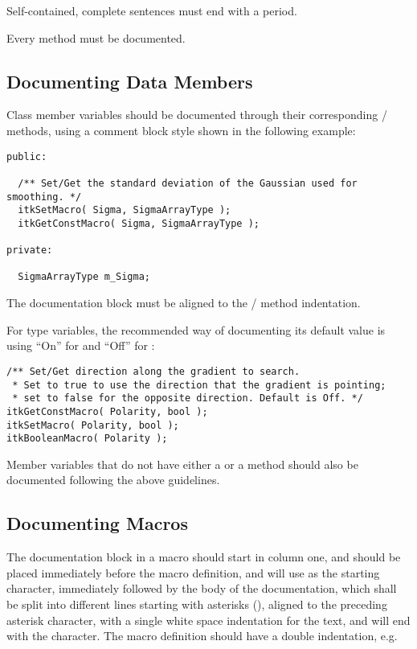 Self-contained, complete sentences must end with a period.

Every method must be documented.


\subsection{Documenting Data Members}
\label{subsec:DocumentingDataMembers}

Class member variables should be documented through their corresponding
/ methods, using a comment block style shown in
the following example:

\small
\begin{verbatim}
public:

  /** Set/Get the standard deviation of the Gaussian used for smoothing. */
  itkSetMacro( Sigma, SigmaArrayType );
  itkGetConstMacro( Sigma, SigmaArrayType );

private:

  SigmaArrayType m_Sigma;

\end{verbatim}
\normalsize

The documentation block must be aligned to the /
method indentation.

For  type variables, the recommended way of documenting its default
value is using ``On'' for  and ``Off'' for :

\small
\begin{verbatim}
/** Set/Get direction along the gradient to search.
 * Set to true to use the direction that the gradient is pointing;
 * set to false for the opposite direction. Default is Off. */
itkGetConstMacro( Polarity, bool );
itkSetMacro( Polarity, bool );
itkBooleanMacro( Polarity );
\end{verbatim}
\normalsize

Member variables that do not have either a  or a
 method should also be documented following the above
guidelines.


\subsection{Documenting Macros}
\label{subsec:DocumentingMacros}

The documentation block in a macro should start in column one, and should be
placed immediately before the macro definition, and will use \code{/*} as the
starting character, immediately followed by the body of the documentation, which
shall be split into different lines starting with asterisks (\code{*}), aligned
to the preceding asterisk character, with a single white space indentation for
the text, and will end with the \code{*/} character. The macro definition
should have a double indentation, e.g.

